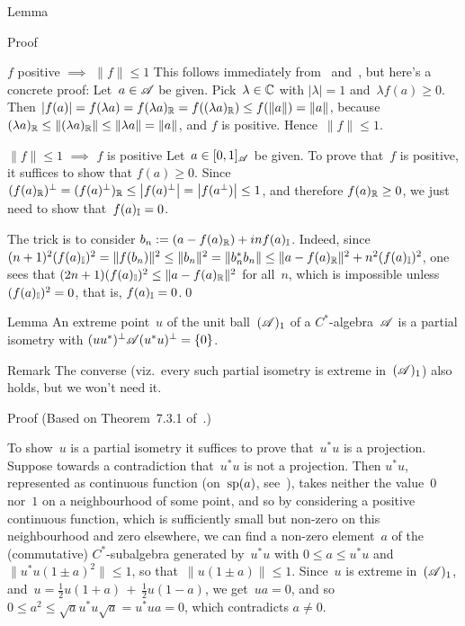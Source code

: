 \documentclass[a]{subfiles}
\begin{document}
\begin{parsec}
\begin{point}{Lemma}
\begin{point}{Proof}
\begin{point}{$f$ positive $\implies$ $\|f\|\leq 1$}%
This follows
immediately from~ and~,
but here's a concrete proof:
Let~$a\in \mathscr{A}$ be given.
Pick~$\lambda\in \mathbb{C}$ with $\left|\lambda\right|=1$
and~$\lambda f(a)\geq 0$.
Then $\left|f(a)\right|=f(\lambda a) 
= f(\lambda a)_{\mathbb{R}}
= f((\lambda a)_{\mathbb{R}})
\leq f(\|a\|)=\|a\|$,
because $(\lambda a)_{\mathbb{R}}
\leq \|(\lambda a)_{\mathbb{R}}\|
\leq \|\lambda a\|=\|a\|$,
and $f$ is positive.
Hence~$\|f\|\leq 1$.
\end{point}
\begin{point}{$\|f\|\leq 1$ $\implies$ $f$ is positive}%
Let~$a\in [0,1]_{\mathscr{A}}$ be given.
To prove that~$f$ is positive, it suffices to show that $f(a)\geq 0$.
Since $(f(a)_{\mathbb{R}})^\perp
=(f(a)^\perp)_{\mathbb{R}}
\leq \left|f(a)^\perp \right|
=\left|f(a^\perp)\right|\leq 1$,
and therefore $f(a)_{\mathbb{R}}\geq 0$,
we just need to show that~$f(a)_{\mathbb{I}}=0$.

The trick is to consider $b_n := (a - f(a)_{\mathbb{R}})+inf(a)_{\mathbb{I}}$.
Indeed, since $(n+1)^2(f(a)_{\mathbb{I}})^2
= \|f(b_n)\|^2 \leq \|b_n\|^2 = 
\|b_n^*b_n\| \leq \|a-f(a)_{\mathbb{R}}\|^2 + n^2(f(a)_{\mathbb{I}})^2$,
one sees that $(2n+1)(f(a)_{\mathbb{I}})^2\leq \|a-f(a)_{\mathbb{R}}\|^2$
for all~$n$,
which is impossible unless~$(f(a)_{\mathbb{I}})^2=0$,
that is, $f(a)_{\mathbb{I}}=0$.\qed
\end{point}
\end{point}
\end{point}
\begin{point}{Lemma}%
An extreme point~$u$ of the unit ball~$(\mathscr{A})_1$
of a $C^*$-algebra~$\mathscr{A}$
is a partial isometry with $(uu^*)^\perp\mathscr{A}(u^*u)^\perp = \{0\}$.
\begin{point}{Remark}%
The converse (viz.~every such partial isometry
is extreme in~$(\mathscr{A})_1$)
also holds, but we won't need it.
\end{point}
\begin{point}{Proof}%
(Based on Theorem~7.3.1 of~\cite{kr}.)

To show~$u$ is a partial isometry
it suffices to prove that~$u^*u$ is a projection.
Suppose towards a contradiction that~$u^*u$ is not a projection.
Then $u^*u$,
represented
as continuous function (on~$\mathrm{sp}(a)$, see~\TODO{}),
takes neither the value~$0$ nor~$1$ on a neighbourhood
of some point,
and so by considering a
positive continuous function,
which is sufficiently small but non-zero on this neighbourhood
and zero elsewhere, 
we can find a non-zero element~$a$ 
of the (commutative) $C^*$-subalgebra generated by~$u^*u$
with $0\leq a\leq u^*u$
and $\|u^*u (1\pm a)^2\|\leq 1$,
so that~$\|u(1\pm a)\|\leq 1$.
Since~$u$ is extreme in~$(\mathscr{A})_1$,
and~$u=\frac{1}{2}u(1+a)\,+\,\frac{1}{2}u(1-a)$,
we get~$ua=0$,
and so $0\leq a^2\leq \sqrt{a}u^*u\sqrt{a}=u^*ua=0$,
which contradicts $a\neq 0$.


\end{point}
\end{point}
\end{parsec}
\end{document}
